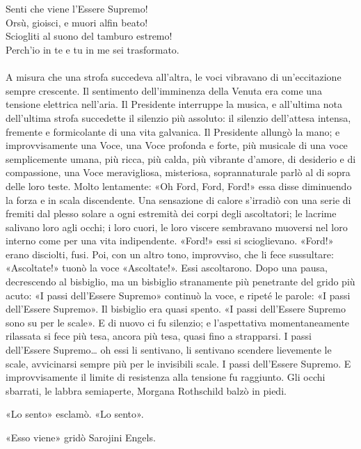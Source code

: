 \documentclass[
a5paper, %
10pt, %
twoside, 
onecolumn, %
openany, %
]{memoir}
\begin{document}
\leavevmode\\\leavevmode\\
{\tiny Senti che viene l’Essere Supremo!\\
Orsù, gioisci, e muori alfin beato!\\
Sciogliti al suono del tamburo estremo!\\
Perch’io in te e tu in me sei trasformato.}
\leavevmode\\\leavevmode\\
A misura che una strofa succedeva all’altra, le voci vibravano di un’eccitazione sempre crescente. Il sentimento dell’imminenza della Venuta era come una tensione elettrica nell’aria. Il Presidente interruppe la musica, e all’ultima nota dell’ultima strofa succedette il silenzio più assoluto: il silenzio dell’attesa intensa, fremente e formicolante di una vita galvanica. Il Presidente allungò la mano; e improvvisamente una Voce, una Voce profonda e forte, più musicale di una voce semplicemente umana, più ricca, più calda, più vibrante d’amore, di desiderio e di compassione, una Voce meravigliosa, misteriosa, soprannaturale parlò al di sopra delle loro teste. Molto lentamente: «Oh Ford, Ford, Ford!» essa disse diminuendo la forza e in scala discendente. Una sensazione di calore s’irradiò con una serie di fremiti dal plesso solare a ogni estremità dei corpi degli ascoltatori; le lacrime salivano loro agli occhi; i loro cuori, le loro viscere sembravano muoversi nel loro interno come per una vita indipendente. «Ford!» essi si scioglievano. «Ford!» erano disciolti, fusi. Poi, con un altro tono, improvviso, che li fece sussultare: «Ascoltate!» tuonò la voce «Ascoltate!». Essi ascoltarono. Dopo una pausa, decrescendo al bisbiglio, ma un bisbiglio stranamente più penetrante del grido più acuto: «I passi dell’Essere Supremo» continuò la voce, e ripeté le parole: «I passi dell’Essere Supremo». Il bisbiglio era quasi spento. «I passi dell’Essere Supremo sono su per le scale». E di nuovo ci fu silenzio; e l’aspettativa momentaneamente rilassata si fece più tesa, ancora più tesa, quasi fino a strapparsi. I passi dell’Essere Supremo… oh essi li sentivano, li sentivano scendere lievemente le scale, avvicinarsi sempre più per le invisibili scale. I passi dell’Essere Supremo. E improvvisamente il limite di resistenza alla tensione fu raggiunto. Gli occhi sbarrati, le labbra semiaperte, Morgana Rothschild balzò in piedi.

«Lo sento» esclamò. «Lo sento».

«Esso viene» gridò Sarojini Engels.
\end{document}
